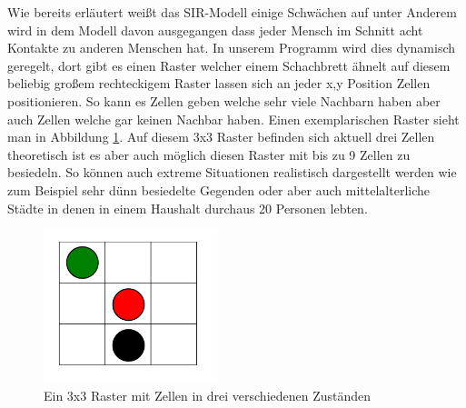 Wie bereits erläutert weißt das SIR-Modell einige Schwächen auf unter Anderem wird in dem Modell davon ausgegangen dass jeder Mensch im Schnitt acht Kontakte zu anderen Menschen hat. In unserem Programm wird dies dynamisch geregelt, dort gibt es einen Raster welcher einem Schachbrett ähnelt auf diesem beliebig großem rechteckigem \glqq{}Raster\grqq{} lassen sich an jeder x,y Position Zellen positionieren. So kann es Zellen geben welche sehr viele Nachbarn haben aber auch Zellen welche gar keinen Nachbar haben. Einen exemplarischen Raster sieht man in  Abbildung \ref{fig:Raster}. Auf diesem 3x3 Raster befinden sich aktuell drei Zellen theoretisch ist es aber auch möglich diesen Raster mit bis zu 9 Zellen zu besiedeln. So können auch extreme Situationen realistisch dargestellt werden wie zum Beispiel sehr dünn besiedelte Gegenden oder aber auch mittelalterliche Städte in denen in einem Haushalt durchaus 20 Personen lebten.\\


\begin{figure}[t]
\centering
\includegraphics[width= 0.45\textwidth]{./images/nachbarn.png}
\caption{Ein 3x3 Raster mit Zellen in drei verschiedenen Zuständen}
\label{fig:Raster}
\end{figure}

